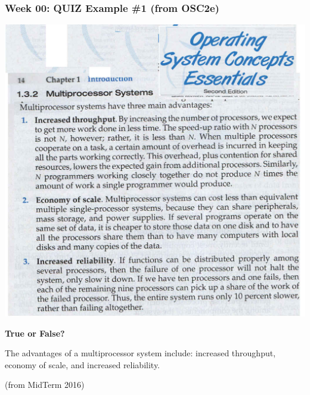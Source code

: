 \documentclass[aspectratio=169, xcolor=table, notheorems, hyperref={pdfpagelabels=false}]{beamer}
\begin{document}
\begin{frame}
\frametitle{Week 00: QUIZ Example \#1 (from OSC2e)}
\begin{multicols}{2}

\includegraphics[width=0.97\linewidth]{os00-osc2e}

\columnbreak
  \null \vfill 

  \textbf{True or False?}

  The advantages of a multiprocessor system include: 
  increased throughput, economy of scale, and increased reliability.

  {\footnotesize (from MidTerm 2016)}
  \vfill \null
\end{multicols}
\end{frame}
\end{document}
